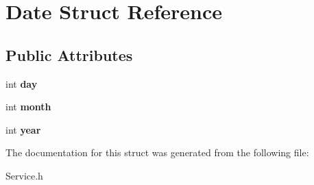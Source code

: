 \hypertarget{struct_date}{}\section{Date Struct Reference}
\label{struct_date}
\subsection*{Public Attributes}
\begin{DoxyCompactItemize}
\item 
\hypertarget{struct_date_a5b192adcabf2b2871e3f0b76c1ec1601}{}int {\bfseries day}\label{struct_date_a5b192adcabf2b2871e3f0b76c1ec1601}

\item 
\hypertarget{struct_date_a533843e07c6ac8d19fee9b16f5336ba2}{}int {\bfseries month}\label{struct_date_a533843e07c6ac8d19fee9b16f5336ba2}

\item 
\hypertarget{struct_date_a3eeced2ed56bc95d56782b9e738db8ea}{}int {\bfseries year}\label{struct_date_a3eeced2ed56bc95d56782b9e738db8ea}

\end{DoxyCompactItemize}


The documentation for this struct was generated from the following file\+:\begin{DoxyCompactItemize}
\item 
Service.\+h\end{DoxyCompactItemize}
